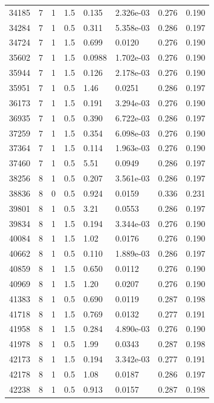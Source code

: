 \documentclass[preview]{standalone}
\begin{document}
{{{\begin{tabular}{L{1.2cm}C{1.2cm} C{0.3cm}C{0.5cm} C{1.4cm}C{1.4cm} C{1.4cm}C{1.4cm}}
  34185  &     7  & 1     & 1.5 &  0.135  & 2.326e-03  & 0.276 &  0.190   \\ 
  34284  &     7  & 1     & 0.5 &  0.311  & 5.358e-03  & 0.286 &  0.197   \\ 
  34724  &     7  & 1     & 1.5 &  0.699  & 0.0120  & 0.276 &  0.190   \\ 
  35602  &     7  & 1     & 1.5 &  0.0988  & 1.702e-03  & 0.276 &  0.190   \\ 
  35944  &     7  & 1     & 1.5 &  0.126  & 2.178e-03  & 0.276 &  0.190   \\ 
  35951  &     7  & 1     & 0.5 &  1.46  & 0.0251  & 0.286 &  0.197   \\ 
  36173  &     7  & 1     & 1.5 &  0.191  & 3.294e-03  & 0.276 &  0.190   \\ 
  36935  &     7  & 1     & 0.5 &  0.390  & 6.722e-03  & 0.286 &  0.197   \\ 
  37259  &     7  & 1     & 1.5 &  0.354  & 6.098e-03  & 0.276 &  0.190   \\ 
  37364  &     7  & 1     & 1.5 &  0.114  & 1.963e-03  & 0.276 &  0.190   \\ 
  37460  &     7  & 1     & 0.5 &  5.51  & 0.0949  & 0.286 &  0.197   \\ 
  38256  &     8  & 1     & 0.5 &  0.207  & 3.561e-03  & 0.286 &  0.197   \\ 
  38836  &     8  & 0     & 0.5 &  0.924  & 0.0159  & 0.336 &  0.231   \\ 
  39801  &     8  & 1     & 0.5 &  3.21  & 0.0553  & 0.286 &  0.197   \\ 
  39834  &     8  & 1     & 1.5 &  0.194  & 3.344e-03  & 0.276 &  0.190   \\ 
  40084  &     8  & 1     & 1.5 &  1.02  & 0.0176  & 0.276 &  0.190   \\ 
  40662  &     8  & 1     & 0.5 &  0.110  & 1.889e-03  & 0.286 &  0.197   \\ 
  40859  &     8  & 1     & 1.5 &  0.650  & 0.0112  & 0.276 &  0.190   \\ 
  40969  &     8  & 1     & 1.5 &  1.20  & 0.0207  & 0.276 &  0.190   \\ 
  41383  &     8  & 1     & 0.5 &  0.690  & 0.0119  & 0.287 &  0.198   \\ 
  41718  &     8  & 1     & 1.5 &  0.769  & 0.0132  & 0.277 &  0.191   \\ 
  41958  &     8  & 1     & 1.5 &  0.284  & 4.890e-03  & 0.276 &  0.190   \\ 
  41978  &     8  & 1     & 0.5 &  1.99  & 0.0343  & 0.287 &  0.198   \\ 
  42173  &     8  & 1     & 1.5 &  0.194  & 3.342e-03  & 0.277 &  0.191   \\ 
  42178  &     8  & 1     & 0.5 &  1.08  & 0.0187  & 0.286 &  0.197   \\ 
  42238  &     8  & 1     & 0.5 &  0.913  & 0.0157  & 0.287 &  0.198   \\ 
\hline 
\end{tabular} 

}}}
\end{document}
